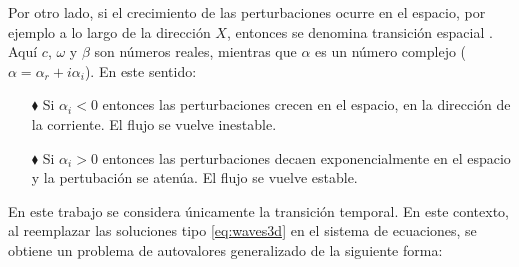 Por otro lado, si el crecimiento de las perturbaciones ocurre en el espacio, por ejemplo a lo largo de la dirección $X$, entonces se denomina transición espacial \cite{machaca2024}. Aquí $c$, $\omega$ y $\beta$ son números reales, mientras que $\alpha$ es un número complejo ($\alpha = \alpha_r + i \alpha_i$). En este sentido:

\begin{itemize}
\item[$\blacklozenge$] Si $\alpha_i < 0$ entonces las perturbaciones crecen en el espacio, en la dirección de la \linebreak corriente. El flujo se vuelve inestable.

\item[$\blacklozenge$] Si $\alpha_i > 0$ entonces las perturbaciones decaen exponencialmente en el espacio y la pertubación se atenúa. El flujo se vuelve estable.
\end{itemize}


En este trabajo se considera únicamente la transición temporal. En este contexto, al reemplazar las soluciones tipo \ref{eq:waves3d} en el sistema de ecuaciones, se obtiene un problema de autovalores generalizado de la siguiente forma:

%
%



